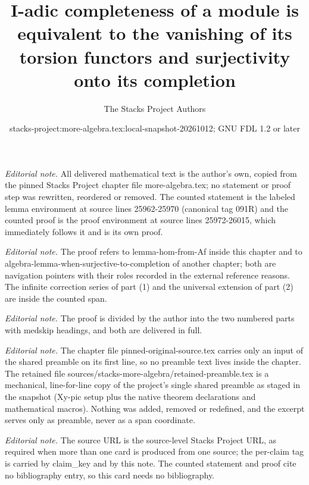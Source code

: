 \documentclass[10pt,a4paper]{amsart}
\title{I-adic completeness of a module is equivalent to the vanishing of its torsion functors and surjectivity onto its completion}
\author{The Stacks Project Authors}
\date{stacks-project:more-algebra.tex:local-snapshot-20261012; GNU FDL 1.2 or later}
\theoremstyle{plain}
\theoremstyle{definition}
\theoremstyle{remark}
\numberwithin{equation}{subsection}
\begin{document}
\maketitle
\setcounter{subsection}{1}
\noindent\textit{Editorial note.} All delivered mathematical text is the author's own, copied from the pinned Stacks Project chapter file more-algebra.tex; no statement or proof step was rewritten, reordered or removed. The counted statement is the labeled lemma environment at source lines 25962-25970 (canonical tag 091R) and the counted proof is the proof environment at source lines 25972-26015, which immediately follows it and is its own proof.\par\medskip
\noindent\textit{Editorial note.} The proof refers to lemma-hom-from-Af inside this chapter and to algebra-lemma-when-surjective-to-completion of another chapter; both are navigation pointers with their roles recorded in the external reference reasons. The infinite correction series of part (1) and the universal extension of part (2) are inside the counted span.\par\medskip
\noindent\textit{Editorial note.} The proof is divided by the author into the two numbered parts with medskip headings, and both are delivered in full.\par\medskip
\noindent\textit{Editorial note.} The chapter file pinned-original-source.tex carries only an input of the shared preamble on its first line, so no preamble text lives inside the chapter. The retained file sources/stacks-more-algebra/retained-preamble.tex is a mechanical, line-for-line copy of the project's single shared preamble as staged in the snapshot (Xy-pic setup plus the native theorem declarations and mathematical macros). Nothing was added, removed or redefined, and the excerpt serves only as preamble, never as a span coordinate.\par\medskip
\noindent\textit{Editorial note.} The source URL is the source-level Stacks Project URL, as required when more than one card is produced from one source; the per-claim tag is carried by claim\_key and by this note. The counted statement and proof cite no bibliography entry, so this card needs no bibliography.\par\medskip
\end{document}
